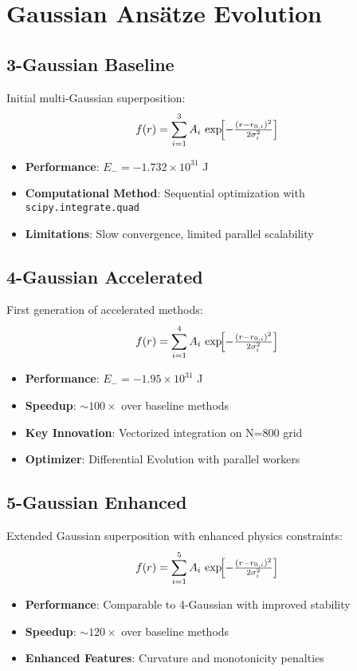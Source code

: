 \documentclass[12pt]{article}
\begin{document}
\section{Gaussian Ansätze Evolution}

\subsection{3-Gaussian Baseline}
Initial multi-Gaussian superposition:
\[
  f(r) = \sum_{i=1}^3 A_i\,\exp\!\Bigl[-\tfrac{(r - r_{0,i})^2}{2\sigma_i^2}\Bigr]
\]

\begin{itemize}
\item \textbf{Performance}: $E_- = -1.732\times10^{31}$ J
\item \textbf{Computational Method}: Sequential optimization with \texttt{scipy.integrate.quad}
\item \textbf{Limitations}: Slow convergence, limited parallel scalability
\end{itemize}

\subsection{4-Gaussian Accelerated}
First generation of accelerated methods:
\[
  f(r) = \sum_{i=1}^4 A_i\,\exp\!\Bigl[-\tfrac{(r - r_{0,i})^2}{2\sigma_i^2}\Bigr]
\]

\begin{itemize}
\item \textbf{Performance}: $E_- = -1.95\times10^{31}$ J
\item \textbf{Speedup}: $\sim100\times$ over baseline methods
\item \textbf{Key Innovation}: Vectorized integration on N=800 grid
\item \textbf{Optimizer}: Differential Evolution with parallel workers
\end{itemize}

\subsection{5-Gaussian Enhanced}
Extended Gaussian superposition with enhanced physics constraints:
\[
  f(r) = \sum_{i=1}^5 A_i\,\exp\!\Bigl[-\tfrac{(r - r_{0,i})^2}{2\sigma_i^2}\Bigr]
\]

\begin{itemize}
\item \textbf{Performance}: Comparable to 4-Gaussian with improved stability
\item \textbf{Speedup}: $\sim120\times$ over baseline methods
\item \textbf{Enhanced Features}: Curvature and monotonicity penalties
\end{itemize}
\end{document}
